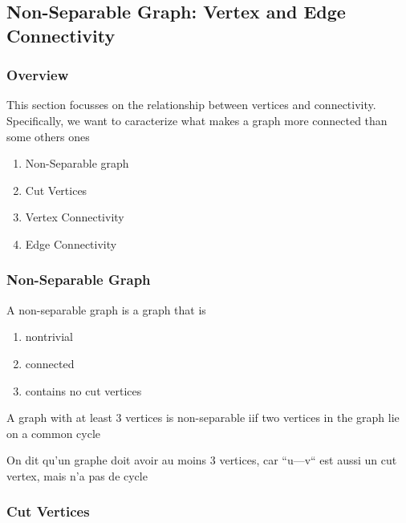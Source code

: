 \documentclass{article}
\begin{document}
\subsection{Non-Separable Graph: Vertex and Edge Connectivity}%
\label{sub:Vertices Cut}

\subsubsection{Overview}%
\label{ssub:Overview}

This section focusses on the relationship between vertices and connectivity.
Specifically, we want to caracterize what makes a graph more connected than
some others ones

\begin{enumerate}
    \item Non-Separable graph
    \item Cut Vertices
    \item Vertex Connectivity
    \item Edge Connectivity
\end{enumerate}

\subsubsection{Non-Separable Graph}%
\label{ssub:Non-Separable Graph}

\begin{definition}
    A non-separable graph is a graph that is
    \begin{enumerate}
        \item nontrivial
	\item connected
	\item contains no cut vertices
    \end{enumerate}
\end{definition}

\begin{theorem}
    A graph with at least 3 vertices is non-separable iif two vertices in
    the graph lie on a common cycle
\end{theorem}

\begin{remark}
    On dit qu'un graphe doit avoir au moins 3 vertices, car ``u---v`` est
    aussi un cut vertex, mais n'a pas de cycle
\end{remark}

\subsubsection{Cut Vertices}
\end{document}
